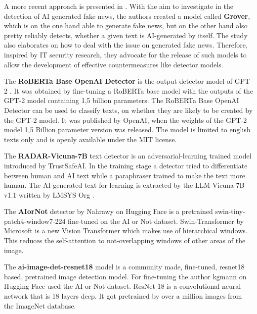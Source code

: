 \documentclass{article} %
\begin{document}
A more recent approach is presented in \cite{zellers2020defending}. With the aim to investigate in the detection of AI generated fake news, the authors created a model called \textbf{Grover}, which is on the one hand able to generate fake news, but on the other hand also pretty reliably detects, whether a given text is AI-generated by itself. The study also elaborates on how to deal with the issue on generated fake news. Therefore, inspired by IT security research, they advocate for the release of such models to allow the development of effective countermeasures like detector models.

The \textbf{RoBERTa Base OpenAI Detector} is the output detector model of GPT-2 \cite{solaiman2019release}. It was obtained by fine-tuning a RoBERTa base model with the outputs of the GPT-2 model containing 1,5 billion parameters. The RoBERTa Base OpenAI Detector can be used to classify texts, on whether they are likely to be created by the GPT-2 model. It was published by OpenAI, when the weights of the GPT-2 model 1,5 Billion parameter version was released. The model is limited to english texts only and is openly available under the MIT license.

The \textbf{RADAR-Vicuna-7B} text detector is an adversarial-learning trained model introduced by TrustSafeAI. In the training stage a detector tried to differentiate between human and AI text while a paraphraser trained to make the text more human. The AI-generated text for learning is extracted by the LLM Vicuna-7B-v1.1 written by LMSYS Org \cite{hu2023radar}.

The \textbf{AIorNot} detector by Nahrawy on Hugging Face is a pretrained swin-tiny-patch4-window7-224 fine-tuned on the AI or Not dataset. Swin-Transformer by Microsoft is a new Vision Transformer which makes use of hierarchical windows. This reduces the self-attention to not-overlapping windows of other areas of the image. \cite{liu2021swin}

The \textbf{ai-image-det-resnet18} model is a community made, fine-tuned, resnet18 based, pretrained image detection model. For fine-tuning the author kgmann on Hugging Face used the AI or Not dataset. ResNet-18 is a convolutional neural network that is 18 layers deep. It got pretrained by over a million images from the ImageNet database. \cite{he2015deep}
\end{document}
